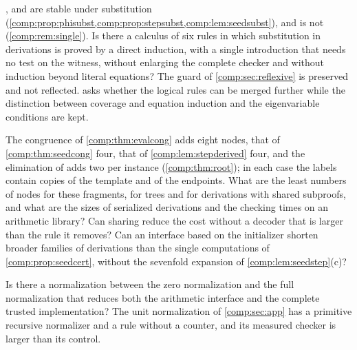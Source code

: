 \begin{question}
,  and  are stable under
substitution (\cref{comp:prop:phisubst,comp:prop:stepsubst,comp:lem:seedsubst}),
and  is not (\cref{comp:rem:single}). Is there a calculus of
six rules in which substitution in derivations is proved by a direct
induction, with a single introduction that needs no test on the witness,
without enlarging the complete checker and without induction beyond literal
equations? The guard of \cref{comp:sec:reflexive} is preserved and not
reflected.  asks whether the logical rules can be merged
further while the distinction between coverage and equation induction and
the eigenvariable conditions are kept.
\end{question}

\begin{question}
The congruence of \cref{comp:thm:evalcong} adds eight nodes, that of
\cref{comp:thm:seedcong} four, that of \cref{comp:lem:stepderived} four,
and the elimination of  adds two per instance
(\cref{comp:thm:root}); in each case the labels contain copies of the
template and of the endpoints. What are the least numbers of nodes for
these fragments, for trees and for derivations with shared subproofs, and
what are the sizes of serialized derivations and the checking times on an
arithmetic library? Can sharing reduce the cost without a decoder that is
larger than the rule it removes? Can an interface based on the initializer
shorten broader families of derivations than the single computations of
\cref{comp:prop:seedcert}, without the sevenfold expansion of
\cref{comp:lem:seedstep}(c)?
\end{question}

\begin{question}
Is there a normalization between the zero normalization and the full
normalization that reduces both the arithmetic interface and the complete
trusted implementation? The unit normalization of \cref{comp:sec:app} has a
primitive recursive normalizer and a rule without a counter, and its
measured checker is larger than its control.
\end{question}

